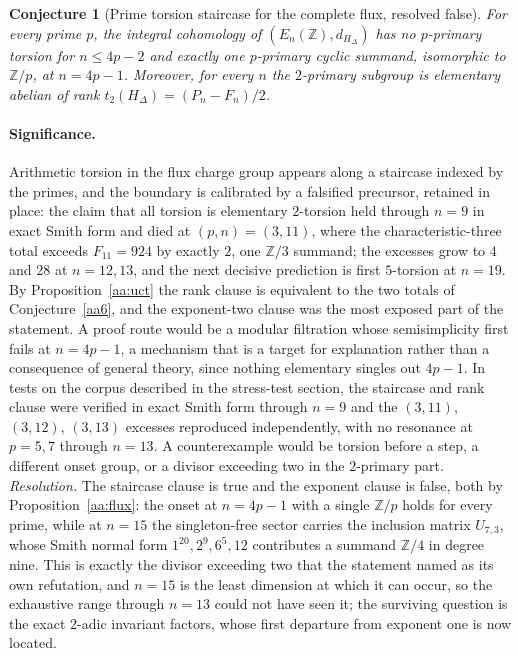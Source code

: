 \documentclass[11pt]{article}
\newtheorem{conjecture}{Conjecture}
\theoremstyle{definition}
\newcommand{\Z}{\mathbb Z}
\providecommand{\Z}{\mathbb Z}
\begin{document}
\begin{conjecture}[Prime torsion staircase for the complete flux, resolved false]\label{aa7}
For every prime $p$, the integral cohomology of $(E_n(\Z),d_{H_\Delta})$ has no $p$-primary torsion for $n\le4p-2$ and exactly one $p$-primary cyclic summand, isomorphic to $\Z/p$, at $n=4p-1$.  Moreover, for every $n$ the $2$-primary subgroup is elementary abelian of rank $t_2(H_\Delta)=(P_n-F_n)/2$.
\end{conjecture}

\paragraph{Significance.}
Arithmetic torsion in the flux charge group appears along a staircase indexed by the primes, and the boundary is calibrated by a falsified precursor, retained in place: the claim that all torsion is elementary $2$-torsion held through $n=9$ in exact Smith form and died at $(p,n)=(3,11)$, where the characteristic-three total exceeds $F_{11}=924$ by exactly $2$, one $\Z/3$ summand; the excesses grow to $4$ and $28$ at $n=12,13$, and the next decisive prediction is first $5$-torsion at $n=19$.  By Proposition~\ref{aa:uct} the rank clause is equivalent to the two totals of Conjecture~\ref{aa6}, and the exponent-two clause was the most exposed part of the statement.  A proof route would be a modular filtration whose semisimplicity first fails at $n=4p-1$, a mechanism that is a target for explanation rather than a consequence of general theory, since nothing elementary singles out $4p-1$.  In tests on the corpus described in the stress-test section, the staircase and rank clause were verified in exact Smith form through $n=9$ and the $(3,11)$, $(3,12)$, $(3,13)$ excesses reproduced independently, with no resonance at $p=5,7$ through $n=13$.  A counterexample would be torsion before a step, a different onset group, or a divisor exceeding two in the $2$-primary part.  \emph{Resolution.} The staircase clause is true and the exponent clause is false, both by Proposition~\ref{aa:flux}: the onset at $n=4p-1$ with a single $\Z/p$ holds for every prime, while at $n=15$ the singleton-free sector carries the inclusion matrix $U_{7,3}$, whose Smith normal form $1^{20},2^{9},6^{5},12$ contributes a summand $\Z/4$ in degree nine.  This is exactly the divisor exceeding two that the statement named as its own refutation, and $n=15$ is the least dimension at which it can occur, so the exhaustive range through $n=13$ could not have seen it; the surviving question is the exact $2$-adic invariant factors, whose first departure from exponent one is now located.
\end{document}
